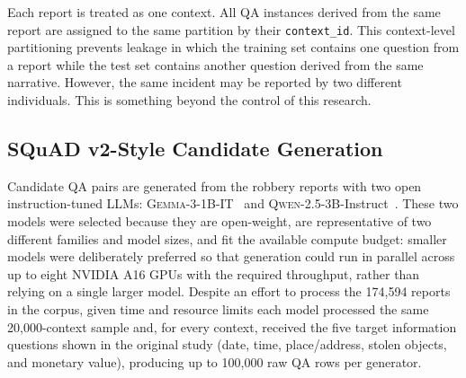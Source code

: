 \documentclass[graybox]{SNmult}
\begin{document}
Each report is treated as one context. All QA instances
derived from the same report are assigned to the same partition by
their \texttt{context\_id}. This context-level partitioning prevents
leakage in which the training set contains one question from a report
while the test set contains another question derived from the same
narrative. However, the same incident may be reported by two different
individuals. This is something beyond the control of this research.


\subsection{SQuAD v2-Style Candidate Generation}

Candidate QA pairs are generated from the robbery reports with two
open instruction-tuned LLMs:
\textsc{Gemma}-3-1B-IT~\cite{gemma3_1b_hf} and
\textsc{Qwen}-2.5-3B-Instruct~\cite{qwen2_5_3b_hf}. These two models
were selected because they are open-weight, are representative of two
different families and model sizes, and fit the available compute budget:
smaller models were deliberately preferred so that generation could run in
parallel across up to eight NVIDIA A16 GPUs with the required throughput,
rather than relying on a single larger model. Despite an effort to process the
174{,}594 reports in the corpus, given time and resource limits each model
processed the same 20{,}000-context sample and, for every context, received
the five target information questions shown in the original study (date, time,
place/address, stolen objects, and monetary value), producing up to
100{,}000 raw QA rows per generator.
\end{document}
